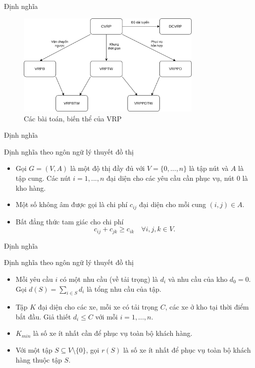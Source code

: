 \begin{frame}{Định nghĩa}
    \begin{figure}[H] %
        \centering %
        \includegraphics[width=0.8\textwidth]{figures/vrp.png} 
        \caption{Các bài toán, biến thể của VRP} %
        \label{fig:fg_01}
      \end{figure}
\end{frame}

\begin{frame}{Định nghĩa}
    \begin{block}{Định nghĩa theo ngôn ngữ lý thuyết đồ thị}
        \begin{itemize}
            \item Gọi $G=(V,A)$ là một độ thị đầy đủ với $V=\{ 0, ..., n \}$ là tập nút và $A$ là tập cung. Các nút $i=1,...,n$ đại diện cho các yêu cầu cần phục vụ, nút $0$ là kho hàng.
            \item Một số không âm được gọi là chi phí $c_{ij}$ đại diện cho mỗi cung $(i,j) \in A$.
            \item Bất đẳng thức tam giác cho chi phí
            \begin{equation}
                c_{ij} + c_{jk} \geq c_{ik} \quad \forall i,j,k \in V.
            \end{equation}
        \end{itemize}
    \end{block}
\end{frame}

\begin{frame}{Định nghĩa}
    \begin{block}{Định nghĩa theo ngôn ngữ lý thuyết đồ thị}
        \begin{itemize}
            \item Mỗi yêu cầu $i$ có một nhu cầu (về tải trọng) là $d_i$ và nhu cầu của kho $d_0=0$. Gọi $d(S) = \sum_{i \in S} d_i$ là tổng nhu cầu của tập.
            \item Tập $K$ đại diện cho các xe, mỗi xe có tải trọng $C$, các xe ở kho tại thời điểm bắt đầu. Giả thiết $d_i \leq C$ với mỗi $i=1,...,n$.
            \item $K_{min}$ là số xe ít nhất cần để phục vụ toàn bộ khách hàng.
            \item Với một tập $S \subseteq V \setminus \{0\}$, gọi $r(S)$ là số xe ít nhất để phục vụ toàn bộ khách hàng thuộc tập $S$.
        \end{itemize}
    \end{block}
\end{frame}

